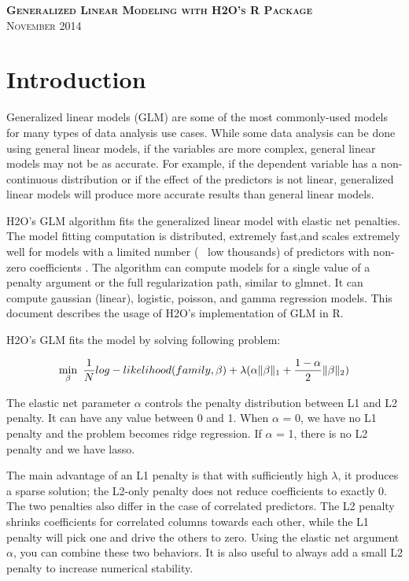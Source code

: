 \documentclass[11pt]{article}
\begin{document}
\thispagestyle{empty} %

\begin{center}
\textsc{\Large\bf{Generalized Linear Modeling  with H2O's R Package}}
\\
\bigskip
\textsc{November 2014}
\end{center}
\bigskip
\bigskip
\bigskip
\bigskip
\tableofcontents

\newpage


\section{Introduction} \label{1}

Generalized linear models (GLM) are some of the most commonly-used models for many types of data analysis use cases. While some data analysis can be done using general linear models, if the variables are more complex, general linear models may not be as accurate. For example, if the dependent variable has a non-continuous distribution or if the effect of the predictors is not linear, generalized linear models will produce more accurate results than general linear models.  

H2O's GLM algorithm fits the generalized linear model with elastic net penalties. The model fitting computation is distributed, extremely fast,and scales extremely well for models with a limited number (~ low thousands) of predictors with non-zero coefficients . The algorithm can compute models for a single value of a penalty argument or the full regularization path, similar to glmnet. It can compute gaussian (linear), logistic, poisson, and gamma regression models. This document describes the usage of H2O's implementation of GLM in R.

H2O's GLM fits the model by solving following problem:

\[ \min\limits_{\beta}\ {{1\over{N}} log-likelihood(family,\beta)  + \lambda (\alpha \| \beta \|_1}  + {1- \alpha \over 2} \| \beta \|_2) \]

The elastic net parameter $\alpha$ controls the penalty distribution between L1 and L2 penalty. It can have any value between 0 and 1. When $\alpha$ = 0, we have no L1 penalty and the problem becomes ridge regression. If $\alpha$ = 1, there is no L2 penalty and we have lasso.

The main advantage of an L1 penalty is that with sufficiently high $\lambda$, it produces a sparse solution; the L2-only penalty does not reduce coefficients to exactly 0. The two penalties also differ in the case of correlated predictors. The L2 penalty shrinks coefficients for correlated columns towards each other, while the L1 penalty will pick one and drive the others to zero. Using the elastic net argument $\alpha$, you can combine these two behaviors. It is also useful to always add a small L2 penalty to increase numerical stability.
\end{document}
